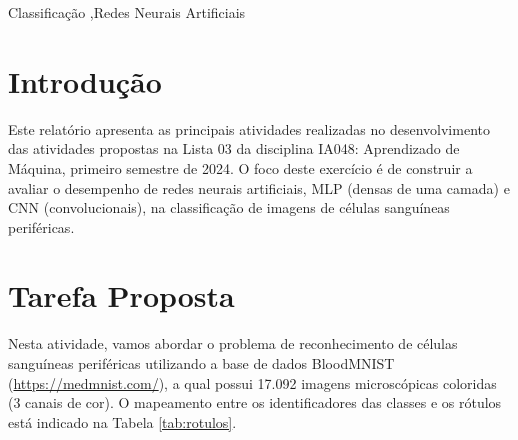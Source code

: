 \documentclass[final,5p]{elsarticle}
\numberwithin{equation}{section}
\begin{document}
\begin{frontmatter}

\begin{keyword}
    Classificação \sep Redes Neurais Artificiais



\end{keyword}

\end{frontmatter}

\section{Introdução}

    Este relatório apresenta as principais atividades realizadas no desenvolvimento das atividades propostas na Lista 03 da disciplina IA048: Aprendizado de Máquina, primeiro semestre de 2024. O foco deste exercício é de construir a avaliar o desempenho de redes neurais artificiais, MLP (densas de uma camada) e CNN (convolucionais), na classificação de imagens de células sanguíneas periféricas.

\section{Tarefa Proposta}

    Nesta atividade, vamos abordar o problema de reconhecimento de células sanguíneas periféricas utilizando a base de dados BloodMNIST \cite{medmnistv1,medmnistv2, acevedo2020dataset} (\href{https://medmnist.com/}{https://medmnist.com/}), a qual possui 17.092 imagens microscópicas coloridas (3 canais de cor). O mapeamento entre os identificadores das classes e os rótulos está indicado na Tabela \ref{tab:rotulos}.
\end{document}
